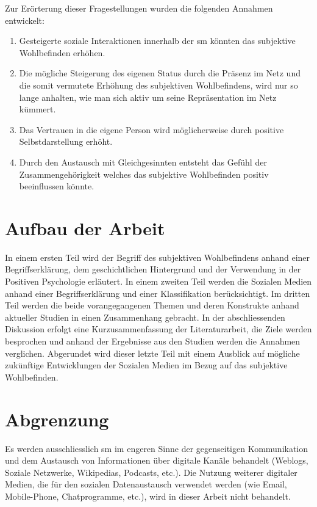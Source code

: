 Zur Erörterung dieser Fragestellungen wurden die folgenden Annahmen entwickelt:

\begin{enumerate}
\item Gesteigerte soziale Interaktionen innerhalb der \gls{sm} könnten das subjektive Wohlbefinden erhöhen.
\item Die mögliche Steigerung des eigenen Status durch die Präsenz im Netz und die somit vermutete Erhöhung des subjektiven Wohlbefindens, wird nur so lange anhalten, wie man sich aktiv um seine Repräsentation im Netz kümmert.
\item Das Vertrauen in die eigene Person wird möglicherweise durch positive Selbstdarstellung erhöht.
\item Durch den Austausch mit Gleichgesinnten entsteht das Gefühl der Zusammengehörigkeit welches das subjektive Wohlbefinden positiv beeinflussen könnte.
\end{enumerate}

\section{Aufbau der Arbeit}\label{sec.aufbau}
In einem ersten Teil wird der Begriff des subjektiven Wohlbefindens anhand einer Begriffserklärung, dem geschichtlichen Hintergrund und der Verwendung in der Positiven Psychologie erläutert. In einem zweiten Teil werden die Sozialen Medien anhand einer Begriffserklärung und einer Klassifikation berücksichtigt. Im dritten Teil werden die beide vorangegangenen Themen und deren Konstrukte anhand aktueller Studien in einen Zusammenhang gebracht. In der abschliessenden Diskussion erfolgt eine Kurzusammenfassung der Literaturarbeit, die Ziele werden besprochen und anhand der Ergebnisse aus den Studien werden die Annahmen verglichen. Abgerundet wird dieser letzte Teil mit einem Ausblick auf mögliche zukünftige Entwicklungen der Sozialen Medien im Bezug auf das subjektive Wohlbefinden.

\section{Abgrenzung}\label{sec.abgrenzung}
Es werden ausschliesslich \gls{sm} im engeren Sinne der gegenseitigen Kommunikation und dem Austausch von Informationen über digitale Kanäle behandelt (Weblogs, Soziale Netzwerke, Wikipedias, Podcasts, etc.). 
Die Nutzung weiterer digitaler Medien, die für den sozialen Datenaustausch verwendet werden (wie Email, Mobile-Phone, Chatprogramme, etc.), wird in dieser Arbeit nicht behandelt.

